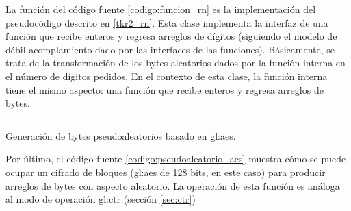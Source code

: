 La función del código fuente \ref{codigo:funcion_rn} es la implementación del
pseudocódigo descrito en \ref{tkr2_rn}. Esta clase implementa la
interfaz de una función que recibe enteros y regresa arreglos de dígitos
(siguiendo el modelo de débil acomplamiento dado por las interfaces de
las funciones). Básicamente, se trata de la transformación de
los bytes aleatorios dados por la función interna en el número de
dígitos pedidos. En el contexto de esta clase, la función interna tiene
el mismo aspecto: una función que recibe enteros y regresa arreglos de bytes.

\begin{listing}
  \inputminted[firstline=51, lastline=82]
    {c++}{../implementaciones/tkr/pseudoaleatorio_aes.cpp}
  \caption{Generación de bytes pseudoaleatorios basado en \acrshort{gl:aes}.}
  \label{codigo:pseudoaleatorio_aes}
\end{listing}

Por último, el código fuente \ref{codigo:pseudoaleatorio_aes} muestra
cómo se puede ocupar un cifrado de bloques (\gls{gl:aes} de 128 bits, en
este caso) para producir arreglos de bytes con aspecto aleatorio. La
operación de esta función es análoga al modo de operación \gls{gl:ctr}
(sección \ref{sec:ctr})

